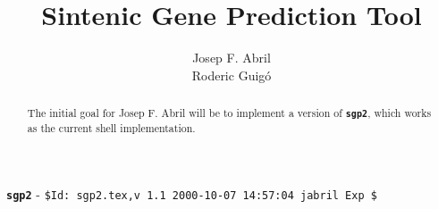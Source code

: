 \documentclass[10pt]{article}
\title{Sintenic Gene Prediction Tool {\sgp}}
\author{Josep F. Abril\\Roderic Guig\'o}
\newcommand{\sgp}{\texttt{\textbf{sgp2}}}
\begin{document}
\maketitle

\begin{abstract}
The initial goal for Josep F. Abril will be to implement a  version of {\sgp}, which works as the current shell implementation.
\end{abstract}

{\Large {\sgp} - \verb+$Id: sgp2.tex,v 1.1 2000-10-07 14:57:04 jabril Exp $+}
\end{document}
